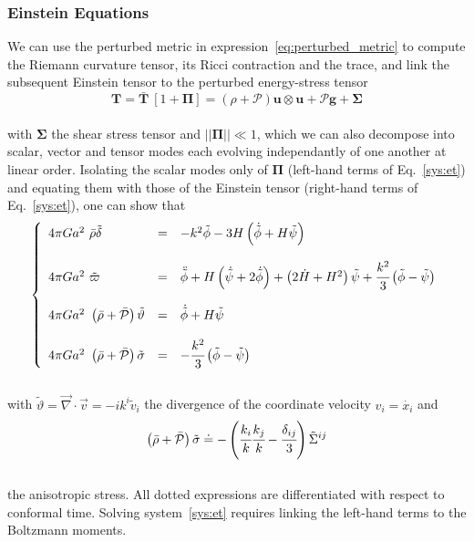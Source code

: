 \subsubsection{Einstein Equations}

We can use the perturbed metric in expression~\ref{eq:perturbed_metric} to compute the Riemann curvature tensor, its Ricci contraction and the trace, and link the subsequent Einstein tensor to the perturbed energy-stress tensor \\
\begin{equation}
\pmb{T} = \bar{\pmb{T}} ~\left[ 1 + \pmb{\Pi} \right] = (\rho + \mathcal{P}) \pmb{u} \otimes \pmb{u} + \mathcal{P}\pmb{g} + \pmb{\Sigma}
\end{equation} \\ with $\pmb{\Sigma}$ the shear stress tensor and $\vert \vert \pmb{\Pi} \vert \vert \ll 1$, which we can also decompose into scalar, vector and tensor modes each evolving independantly of one another at linear order. Isolating the scalar modes only of $\pmb{\Pi}$ (left-hand terms of Eq.~\ref{sys:et}) and equating them with those of the Einstein tensor (right-hand terms of Eq.~\ref{sys:et}), one can show that \\
\begin{equation}
\label{sys:et}
\left\{
\begin{array}{lcl}
4 \pi G a^2~ \bar{\rho} \tilde{\delta} &=& - k^2 \tilde{\phi} - 3 H \left( \dot{\tilde{\phi}} + H \tilde{\psi} \right)\\
\\
4 \pi G a^2~ \tilde{\varpi} &=& \ddot{\tilde{\phi}} + H \left( \dot{\tilde{\psi}} + 2 \dot{\tilde{\phi}} \right) + \left( 2 \dot{H} + H^2 \right) \tilde{\psi} + \cfrac{k^2}{3} \left( \tilde{\phi} - \tilde{\psi} \right) \\
\\
4 \pi G a^2~ \left( \bar{\rho} + \bar{\mathcal{P}} \right) \tilde{\vartheta} &=& \dot{\tilde{\phi}} + H \tilde{\psi}\\
\\
4 \pi G a^2~ \left( \bar{\rho} + \bar{\mathcal{P}} \right) \tilde{\sigma} &=& - \cfrac{k^2}{3} \left( \tilde{\phi} - \tilde{\psi} \right)\\
\end{array}
\right.
\end{equation} \\ with $\tilde{\vartheta} = \vec{\nabla} \cdot \vec{v} = -i k^i \tilde{v}_i$ the divergence of the coordinate velocity $v_i = \dot{x_i}$ and \\
\begin{equation}
\left( \bar{\rho} + \bar{\mathcal{P}} \right) \tilde{\sigma} \doteq - \left( \cfrac{k_i}{k}\cfrac{k_j}{k} - \cfrac{\delta_{ij}}{3} \right) \tilde{\Sigma}^{ij}
\end{equation} \\ the anisotropic stress. All dotted expressions are differentiated with respect to conformal time. Solving system~\ref{sys:et} requires linking the left-hand terms to the Boltzmann moments. 


